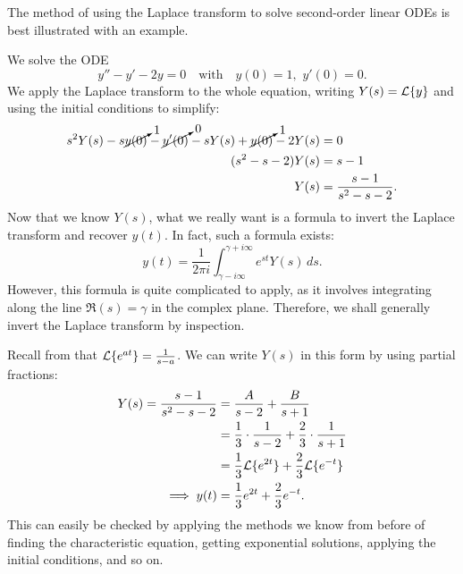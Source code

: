 The method of using the Laplace transform to solve second-order linear ODEs is best illustrated with an example.

\begin{eg}
	We solve the ODE
	\[
	y''-y'-2y = 0 \quad\text{with}\quad y(0)=1, \,\,y'(0)=0.
	\]
	We apply the Laplace transform to the whole equation, writing $Y(s) = \mathcal{L}\{y\}$ and using the initial conditions to simplify:
	\begin{align*}
		s^2Y(s) - s\cancelto{1}{y(0)} - \cancelto{0}{y'(0)} - sY(s) + \cancelto{1}{y(0)} - 2Y(s) &= 0 \\
		(s^2-s-2)Y(s) &= s-1 \\
		Y(s) &= \frac{s-1}{s^2-s-2}.
	\end{align*}
	Now that we know $Y(s)$, what we really want is a formula to invert the Laplace transform and recover $y(t)$. In fact, such a formula exists:
	\[
	y(t) = \frac{1}{2\pi i} \int_{\gamma-i\infty}^{\gamma+i\infty} e^{st}Y(s) \,ds.
	\]
	However, this formula is quite complicated to apply, as it involves integrating along the line $\Re(s) = \gamma$ in the complex plane. Therefore, we shall generally invert the Laplace transform by inspection.
	
	Recall from  that $\mathcal{L}\{e^{at}\} = \frac{1}{s-a}$. We can write $Y(s)$ in this form by using partial fractions:
	\begin{align*}
		Y(s) = \frac{s-1}{s^2-s-2} &= \frac{A}{s-2} + \frac{B}{s+1} \\
		&= \frac13\cdot\frac{1}{s-2} + \frac23\cdot\frac{1}{s+1} \\
		&= \frac13\mathcal{L}\{e^{2t}\} + \frac23\mathcal{L}\{e^{-t}\} \\
		\implies y(t) &= \frac13e^{2t} + \frac23e^{-t}.
	\end{align*}
	This can easily be checked by applying the methods we know from before of finding the characteristic equation, getting exponential solutions, applying the initial conditions, and so on.
\end{eg}

